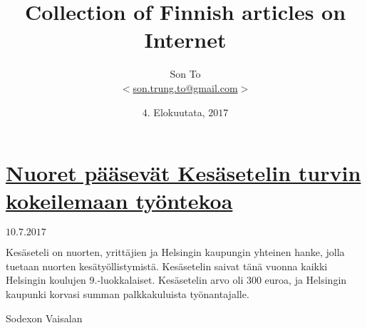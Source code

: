 \documentclass[a4paper,11pt]{article}
\begin{document}
  \title{Collection of Finnish articles on Internet}
  \author{Son To\\
  $<$\href{mailto:son.trung.to@gmail.com}%
  {son.trung.to@gmail.com}$>$}
  \date{$4.$ Elokuutata, $2017$}

  \maketitle
  \tableofcontents

  \section{\href{http://www.sodexo.fi/yritys/uutiset/2017-06-20-nuoret-paasevat-kesasetelin-turvin-kokeilemaan-tyontekoa}%
  {Nuoret pääsevät Kesäsetelin turvin kokeilemaan työntekoa}}
  $10.7.2017$
  \par
  Kesäseteli on nuorten, yrittäjien ja Helsingin kaupungin
  yhteinen hanke, jolla tuetaan nuorten kesätyöllistymistä.
  Kesäsetelin saivat tänä vuonna kaikki Helsingin koulujen
  $9.$-luokkalaiset. Kesäsetelin arvo oli $300$ euroa, ja
  Helsingin kaupunki korvasi summan palkkakuluista
  työnantajalle.
  \par
  Sodexon Vaisalan
\end{document}
